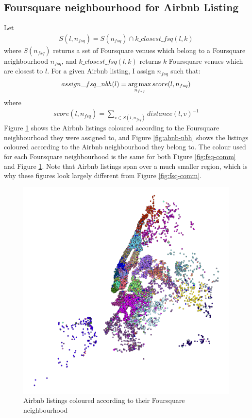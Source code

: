 \subsection{Foursquare neighbourhood for Airbnb Listing}
Let
\begin{align*}
S(l, n_{fsq}) = S(n_{fsq}) \cap k\_closest\_fsq(l, k)
\end{align*}
where $S(n_{fsq})$ returns a set of Foursquare venues which belong to a Foursquare neighbourhood $n_{fsq}$, and $k\_closest\_fsq(l, k)$ returns $k$ Foursquare venues which are closest to $l$. For a given Airbnb listing, I assign $n_{fsq}$ such that:
\begin{align*}
assign\_fsq\_nbh(l) = \operatorname*{arg\,max}_{n_{fsq}} score(l, n_{fsq})
\end{align*}
where
\begin{align*}
score(l, n_{fsq}) =  \sum_{v \in S(l, n_{fsq})}distance(l, v)^{-1}
\end{align*}
Figure \ref{fig:abnb-comm} shows the Airbnb listings coloured according to the Foursquare neighbourhood they were assigned to, and Figure \ref{fig:abnb-nbh} shows the listings coloured according to the Airbnb neighbourhood they belong to. The colour used for each Foursquare neighbourhood is the same for both Figure \ref{fig:fsq-comm} and Figure \ref{fig:abnb-comm}. Note that Airbnb listings span over a much smaller region, which is why these figures look largely different from Figure \ref{fig:fsq-comm}. 
\begin{figure}
\centering
\includegraphics[width=\columnwidth]{../foo_3.png}
\caption{Airbnb listings coloured according to their Foursquare neighbourhood}
\label{fig:abnb-comm}
\end{figure}

